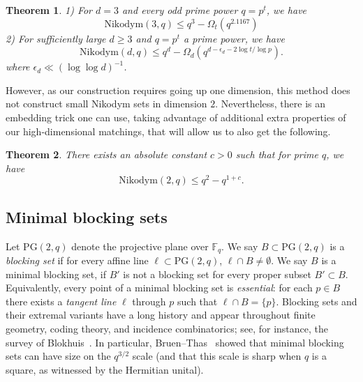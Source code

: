 \documentclass[12pt,reqno]{amsart}
\theoremstyle{plain}
\newtheorem{theorem}{Theorem}[section]
\theoremstyle{definition}
\newtheorem{remark}[theorem]{Remark}
\newcommand{\F}{\mathbb{F}}
\newcommand{\PG}{\mathrm{PG}}
\newcommand{\Nik}{\mathrm{Nikodym}}
\newcommand{\1}{\mathbf{1}}
\begin{document}
\begin{theorem}
    \label{thm:nikodym-3d}
    1) For $d = 3$ and every odd prime power $q = p^t$, we have
    $$\Nik(3, q) \leq q^3 - \Omega_t(q^{2.1167})$$
    2) For sufficiently large $d \geq 3$ and $q = p^t$ a prime power, we have
    $$\Nik(d, q) \leq q^d - \Omega_d\left(q^{d - \epsilon_d - 2\log t / \log p}\right).$$
    where $\epsilon_d \ll (\log\log d)^{-1}$.
\end{theorem}


 However, as our construction requires going up one dimension, this method does not construct small Nikodym sets in dimension $2$. Nevertheless, there is an embedding trick one can use, taking advantage of additional extra properties of our high-dimensional matchings, that will allow us to also get the following.
\begin{theorem}
    \label{thm:nikodym-2d}
    There exists an absolute constant $c > 0$ such that for prime $q$, we have
    $$\Nik(2, q) \leq q^{2} - q^{1+c}.$$
\end{theorem}


\subsection{Minimal blocking sets} Let $\PG(2, q)$ denote the projective plane over $\F_q$. We say $B \subset \PG(2, q)$ is a \textit{blocking set} if for every affine line $\ell\subset \PG(2, q)$, $\ell\cap B\neq \emptyset$. We say $B$ is a minimal blocking set, if $B'$ is not a blocking set for every proper subset $B'\subset B$. Equivalently, every point
of a minimal blocking set is \emph{essential}: for each $p\in B$ there exists a \emph{tangent line}
$\ell$ through $p$ such that $\ell\cap B=\{p\}$. Blocking sets and their extremal variants have a long history
and appear throughout finite geometry, coding theory, and incidence combinatorics; see, for instance,
the survey of Blokhuis~\cite{Blokhuis1996BlockingSets}.
In particular, Bruen--Thas~\cite{BruenThas1977} showed that minimal blocking sets can have size on the
$q^{3/2}$ scale (and that this scale is sharp when $q$ is a square, as witnessed by the Hermitian unital). 
\end{document}
